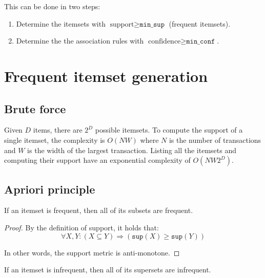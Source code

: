 \begin{description}
        This can be done in two steps:
        \begin{enumerate}
            \item {}
                Determine the itemsets with $\text{support} \geq \texttt{min\_sup}$ (frequent itemsets).
            \item {}
                Determine the the association rules with $\text{confidence} \geq \texttt{min\_conf}$.
        \end{enumerate}
\end{description}



\section{Frequent itemset generation}

\subsection{Brute force}
Given $D$ items, there are $2^D$ possible itemsets.
To compute the support of a single itemset, the complexity is $O(NW)$ where 
$N$ is the number of transactions and $W$ is the width of the largest transaction.
Listing all the itemsets and computing their support have an exponential complexity of $O(NW2^D)$.


\subsection{Apriori principle}

\begin{theorem} 
    If an itemset is frequent, then all of its subsets are frequent.

    \begin{proof}
        By the definition of support, it holds that:
        \[ \forall X, Y: (X \subseteq Y) \Rightarrow (\texttt{sup}(X) \geq \texttt{sup}(Y)) \]

        In other words, the support metric is anti-monotone.
    \end{proof}
\end{theorem}

\begin{corollary}
    If an itemset is infrequent, then all of its supersets are infrequent.
\end{corollary}

